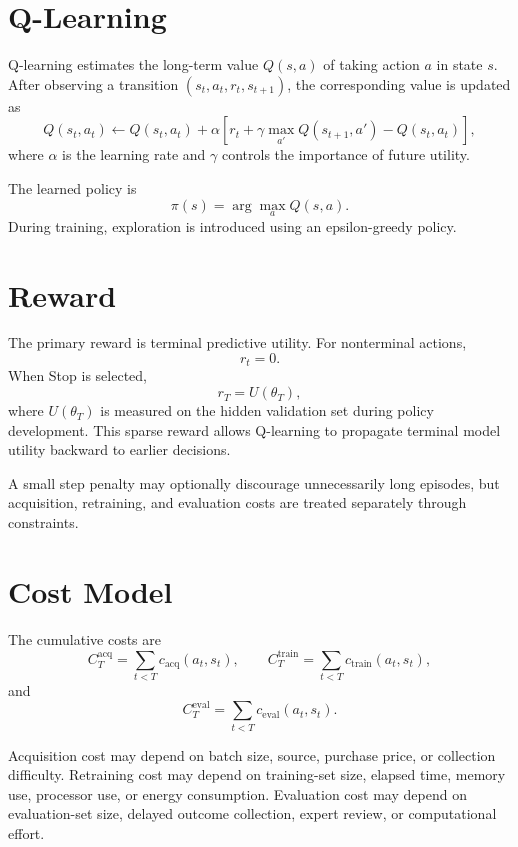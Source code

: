 \documentclass[11pt,letterpaper]{article}
\begin{document}
\section{Q-Learning}

Q-learning estimates the long-term value \(Q(s,a)\) of taking action \(a\) in
state \(s\). After observing a transition
\((s_t,a_t,r_t,s_{t+1})\), the corresponding value is updated as
\[
    Q(s_t,a_t)
    \leftarrow
    Q(s_t,a_t)
    +
    \alpha
    \left[
        r_t
        +
        \gamma\max_{a'}Q(s_{t+1},a')
        -
        Q(s_t,a_t)
    \right],
\]
where \(\alpha\) is the learning rate and \(\gamma\) controls the importance
of future utility.

The learned policy is
\[
    \pi(s)=\arg\max_a Q(s,a).
\]
During training, exploration is introduced using an epsilon-greedy policy.

\section{Reward}

The primary reward is terminal predictive utility. For nonterminal actions,
\[
    r_t=0.
\]
When Stop is selected,
\[
    r_T=U(\theta_T),
\]
where \(U(\theta_T)\) is measured on the hidden validation set during policy
development. This sparse reward allows Q-learning to propagate terminal model
utility backward to earlier decisions.

A small step penalty may optionally discourage unnecessarily long episodes,
but acquisition, retraining, and evaluation costs are treated separately
through constraints.

\section{Cost Model}

The cumulative costs are
\[
    C_T^{\mathrm{acq}}
    =
    \sum_{t<T}c_{\mathrm{acq}}(a_t,s_t),
    \qquad
    C_T^{\mathrm{train}}
    =
    \sum_{t<T}c_{\mathrm{train}}(a_t,s_t),
\]
and
\[
    C_T^{\mathrm{eval}}
    =
    \sum_{t<T}c_{\mathrm{eval}}(a_t,s_t).
\]

Acquisition cost may depend on batch size, source, purchase price, or
collection difficulty. Retraining cost may depend on training-set size,
elapsed time, memory use, processor use, or energy consumption. Evaluation
cost may depend on evaluation-set size, delayed outcome collection, expert
review, or computational effort.
\end{document}
